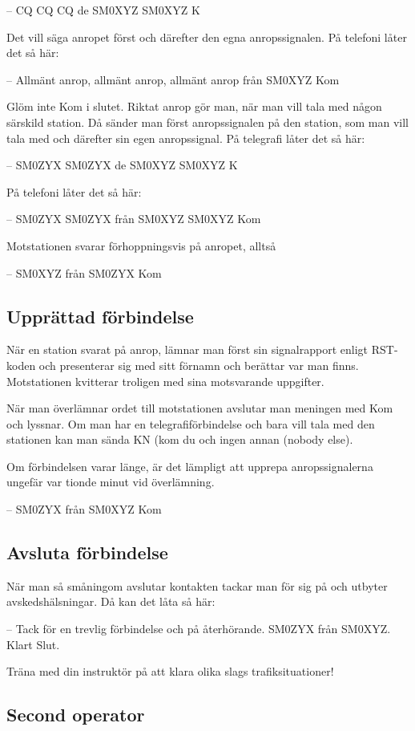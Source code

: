 -- CQ CQ CQ de SM0XYZ SM0XYZ K

Det vill säga anropet först och därefter den egna anropssignalen.
På telefoni låter det så här:

-- Allmänt anrop, allmänt anrop, allmänt anrop från SM0XYZ Kom

Glöm inte Kom i slutet.
Riktat anrop gör man, när man vill tala med någon särskild station.
Då sänder man först anropssignalen på den station, som man vill tala med och
därefter sin egen anropssignal.
På telegrafi låter det så här:

-- SM0ZYX SM0ZYX de SM0XYZ SM0XYZ K

På telefoni låter det så här:

-- SM0ZYX SM0ZYX från SM0XYZ SM0XYZ Kom

Motstationen svarar förhoppningsvis på anropet, alltså

-- SM0XYZ från SM0ZYX Kom

\subsection{Upprättad förbindelse}

När en station svarat på anrop, lämnar man först sin signalrapport
enligt RST-koden och presenterar sig med sitt förnamn och berättar var man finns.
Motstationen kvitterar troligen med sina motsvarande uppgifter.

När man överlämnar ordet till motstationen avslutar man meningen med Kom och lyssnar.
Om man har en telegrafiförbindelse och bara vill tala med den stationen kan man
sända KN (kom du och ingen annan (nobody else).

Om förbindelsen varar länge, är det lämpligt att upprepa anropssignalerna
ungefär var tionde minut vid överlämning.

-- SM0ZYX från SM0XYZ Kom

\subsection{Avsluta förbindelse}

När man så småningom avslutar kontakten tackar man för sig på och utbyter
avskedshälsningar. Då kan det låta så här:

-- Tack för en trevlig förbindelse och på återhörande. SM0ZYX från
SM0XYZ. Klart Slut.

Träna med din instruktör på att klara olika slags trafiksituationer!

\subsection{Second operator}
\label{secondoperator}

